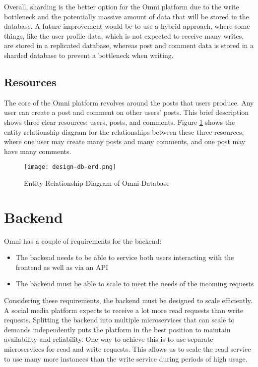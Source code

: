 Overall, sharding is the better option for the Omni platform due to the write bottleneck and the potentially massive amount of data that will be stored in the database.
A future improvement would be to use a hybrid approach, where some things, like the user profile data, which is not expected to receive many writes, are stored in a replicated database, whereas post and comment data is stored in a sharded database to prevent a bottleneck when writing.

\subsection{Resources}
The core of the Omni platform revolves around the posts that users produce. Any user can create a post and comment on other users' posts.
This brief description shows three clear resources: users, posts, and comments.
Figure \ref{fig:db-erd-design} shows the entity relationship diagram for the relationships between these three resources, where one user may create many posts and many comments, and one post may have many comments.

\begin{figure}[htbp]
\texttt{[image: design-db-erd.png]}
\centering
\caption{Entity Relationship Diagram of Omni Database}
\label{fig:db-erd-design}
\end{figure}


\section{Backend}
\label{sec:design-system-backend}
Omni has a couple of requirements for the backend:
\begin{itemize}
    \item The backend needs to be able to service both users interacting with the frontend as well as via an API
    \item The backend must be able to scale to meet the needs of the incoming requests
\end{itemize}
Considering these requirements, the backend must be designed to scale efficiently. A social media platform expects to receive a lot more read requests than write requests.
Splitting the backend into multiple microservices that can scale to demands independently puts the platform in the best position to maintain availability and reliability. 
One way to achieve this is to use separate microservices for read and write requests. This allows us to scale the read service to use many more instances than the write service during periods of high usage. 

